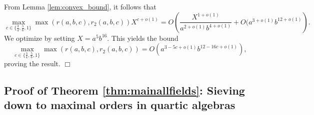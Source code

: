 \documentclass{article}
\newenvironment{proof}{\noindent {\bf Proof:}}{$\Box$ \vspace{2 ex}}
\begin{document}
\vspace{.1in}
\begin{proof}
From Lemma \ref{lem:convex_bound}, it follows that
$$ \max_{c\in\{\frac34,\frac56,1\}}\max(r(a,b,c),r_2(a,b,c))X^{c+o(1)} = O\left(\frac{X^{1+o(1)}}{a^{2+o(1)}b^{4+o(1)}}+O(a^{3+o(1)}b^{12+o(1)}\right).$$
We optimize by setting $X=a^5b^{16}$. This yields the bound
 \begin{equation}\label{eq:allresbound}
    \max_{c\in\{\frac34,\frac56,1\}}\max(r(a,b,c),r_2(a,b,c))=O(a^{3-5c+o(1)}b^{12-16c+o(1)}),
 \end{equation}  
proving the result.
\end{proof}




\subsection{Proof of Theorem \ref{thm:mainallfields}: Sieving down to maximal orders in quartic algebras}\label{subsection:sieveexecution}
\end{document}
